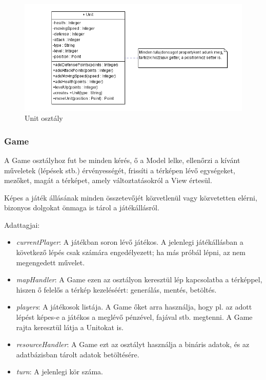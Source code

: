 \documentclass[a4paper,12pt]{report}
\begin{document}
\begin{figure}[hbtp]
\centering
\includegraphics[width=1\textwidth]{Unit.png}
\caption{Unit osztály}
\label{fig:unitclass}
\end{figure}

\subsubsection{Game}
A Game osztályhoz fut be minden kérés, ő a Model lelke, ellenőrzi a kívánt műveletek (lépések stb.) érvényességét, frissíti a térképen lévő egységeket, mezőket, magát a térképet, amely változtatásokról a View értesül.

Képes a játék állásának minden összetevőjét közvetlenül vagy közvetetten elérni, bizonyos dolgokat önmaga is tárol a játékállásról.

Adattagjai:
\begin{itemize}
\item \textit{currentPlayer}: A játékban soron lévő játékos. A jelenlegi játékállásban a következő lépés csak számára engedélyezett; ha más próbál lépni, az nem megengedett művelet.
\item \textit{mapHandler}: A Game ezen az osztályon keresztül lép kapcsolatba a térképpel, hiszen ő felelős a térkép kezeléséért: generálás, mentés, betöltés.
\item \textit{players}: A játékosok listája. A Game őket arra használja, hogy pl. az adott lépést képes-e a játékos a meglévő pénzével, fajával stb. megtenni. A Game rajta keresztül látja a Unitokat is.
\item \textit{resourceHandler}: A Game ezt az osztályt használja a bináris adatok, és az adatbázisban tárolt adatok betöltésére.
\item \textit{turn}: A jelenlegi kör száma.
\end{itemize}
\end{document}
